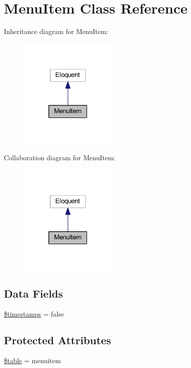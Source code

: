 \hypertarget{class_menu_item}{}\section{Menu\+Item Class Reference}
\label{class_menu_item}


Inheritance diagram for Menu\+Item\+:
\nopagebreak
\begin{figure}[H]
\begin{center}
\leavevmode
\includegraphics[width=139pt]{class_menu_item__inherit__graph}
\end{center}
\end{figure}


Collaboration diagram for Menu\+Item\+:
\nopagebreak
\begin{figure}[H]
\begin{center}
\leavevmode
\includegraphics[width=139pt]{class_menu_item__coll__graph}
\end{center}
\end{figure}
\subsection*{Data Fields}
\begin{DoxyCompactItemize}
\item 
\hyperlink{class_menu_item_a51267c24c8fae742ed8f9be0ba6085ee}{\$timestamps} = false
\end{DoxyCompactItemize}
\subsection*{Protected Attributes}
\begin{DoxyCompactItemize}
\item 
\hyperlink{class_menu_item_ae8876a14058f368335baccf35af4a22b}{\$table} = \textquotesingle{}menuitem\textquotesingle{}
\end{DoxyCompactItemize}


